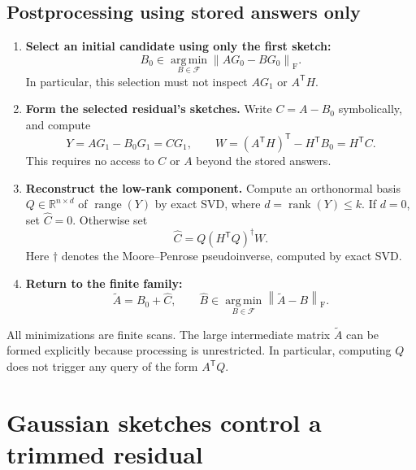 \documentclass[11pt]{article}
\numberwithin{equation}{section}
\theoremstyle{remark}
\newcommand{\R}{\mathbb R}
\newcommand{\F}{\mathcal F}
\newcommand{\rank}{\operatorname{rank}}
\newcommand{\range}{\operatorname{range}}
\newcommand{\norm}[1]{\left\lVert #1\right\rVert_{\mathrm F}}
\newcommand{\argmin}{\operatorname*{arg\,min}}
\newcommand{\T}{\mathsf T}
\begin{document}
\subsection{Postprocessing using stored answers only}
\begin{enumerate}[label=\textbf{\arabic*.}]
 \item \textbf{Select an initial candidate using only the first sketch:}
 \begin{equation}\label{eq:warmchoice}
 B_0\in\argmin_{B\in\F}\norm{AG_0-BG_0}.
 \end{equation}
 In particular, this selection must not inspect $AG_1$ or $A^\T H$.
 \item \textbf{Form the selected residual's sketches.} Write $C=A-B_0$ symbolically, and compute
 \begin{equation}\label{eq:residualsketches}
 Y=AG_1-B_0G_1=CG_1,\qquad
 W=(A^\T H)^\T-H^\T B_0=H^\T C.
 \end{equation}
 This requires no access to $C$ or $A$ beyond the stored answers.
 \item \textbf{Reconstruct the low-rank component.} Compute an orthonormal basis $Q\in\R^{n\times d}$ of $\range(Y)$ by exact SVD, where $d=\rank(Y)\le k$. If $d=0$, set $\widehat C=0$. Otherwise set
 \begin{equation}\label{eq:reconstruct}
 \widehat C=Q(H^\T Q)^\dagger W.
 \end{equation}
 Here $\dagger$ denotes the Moore--Penrose pseudoinverse, computed by exact SVD.
 \item \textbf{Return to the finite family:}
 \begin{equation}\label{eq:finalselection}
 \widetilde A=B_0+\widehat C,\qquad
 \widehat B\in\argmin_{B\in\F}\norm{\widetilde A-B}.
 \end{equation}
\end{enumerate}
All minimizations are finite scans. The large intermediate matrix $\widetilde A$ can be formed explicitly because processing is unrestricted. In particular, computing $Q$ does not trigger any query of the form $A^\T Q$.

\section{Gaussian sketches control a trimmed residual}\label{sec:tails}
\end{document}
